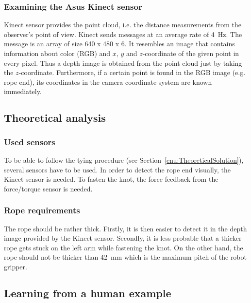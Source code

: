         \subsubsection{Examining the Asus Kinect sensor}
            Kinect sensor provides the point cloud, i.e. the distance measurements from the observer's point of view. Kinect sends messages at an average rate of \SI{4}{Hz}. The message is an array of size 640 x 480 x 6. It resembles an image that contains information about color (RGB) and $x$, $y$ and $z$-coordinate of the given point in every pixel. Thus a depth image is obtained from the point cloud just by taking the $z$-coordinate. Furthermore, if a certain point is found in the RGB image (e.g. rope end), its coordinates in the camera coordinate system are known immediately.

    \subsection{Theoretical analysis}

        \subsubsection{Used sensors}
            To be able to follow the tying procedure (see Section~\ref{enu:TheoreticalSolution}), several sensors have to be used. In order to detect the rope end visually, the Kinect sensor is needed. To fasten the knot, the force feedback from the force/torque sensor is needed.

        \subsubsection{Rope requirements}
            The rope should be rather thick. Firstly, it is then easier to detect it in the depth image provided by the Kinect sensor. Secondly, it is less probable that a thicker rope gets stuck on the left arm while fastening the knot. On the other hand, the rope should not be thicker than \SI{42}{mm} which is the maximum pitch of the robot gripper.


    \subsection{Learning from a human example}

